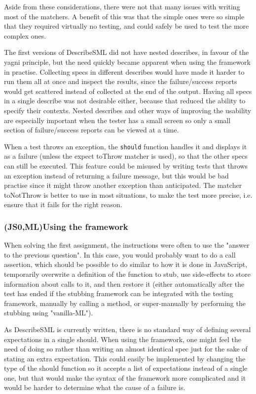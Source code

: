 \documentclass[11pt]{article}
\begin{document}
Aside from these considerations, there were not that many issues with writing most of the matchers. A benefit of this was that the simple ones were so simple that they required virtually no testing, and could safely be used to test the more complex ones.

The first versions of DescribeSML did not have nested describes, in favour of the \gls{yagni} principle, but the need quickly became apparent when using the framework in practise. Collecting specs in different describes would have made it harder to run them all at once and inspect the results, since the failure/success reports would get scattered instead of collected at the end of the output. Having all specs in a single describe was not desirable either, because that reduced the ability to specify their contexts. Nested describes and other ways of improving the usability are especially important when the tester has a small screen so only a small section of failure/success reports can be viewed at a time.

When a test throws an exception, the \texttt{should} function handles it and displays it as a failure (unless the expect toThrow matcher is used), so that the other specs can still be executed. This feature could be misused by writing tests that throws an exception instead of returning a failure message, but this would be bad practise since it might throw another exception than anticipated. The matcher toNotThrow is better to use in most situations, to make the test more precise, i.e. ensure that it fails for the right reason.

\subsubsection{(JS0,ML)Using the framework}

When solving the first assignment, the instructions were often to use the "answer to the previous question". In this case, you would probably want to do a call assertion, which should be possible to do similar to how it is done in JavaScript, temporarily overwrite a definition of the function to stub, use side-effects to store information about calls to it, and then restore it (either automatically after the test has ended if the stubbing framework can be integrated with the testing framework, manually by calling a method, or super-manually by performing the stubbing using "vanilla-ML").

As DescribeSML is currently written, there is no standard way of defining several expectations in a single should. When using the framework, one might feel the need of doing so rather than writing an almost identical spec just for the sake of stating an extra expectation. This could easily be implemented by changing the type of the should function so it accepts a list of expectations instead of a single one, but that would make the syntax of the framework more complicated and it would be harder to determine what the cause of a failure is.
\end{document}
